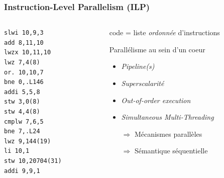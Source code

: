 \documentclass[xcolor={x11names,svgnames}]{beamer}
\begin{document}
\begin{frame}[fragile]
  \frametitle{Instruction-Level Parallelism (ILP)}

  \begin{columns}
    \begin{column}{3cm}  
\begin{verbatim}
slwi 10,9,3
add 8,11,10
lwzx 10,11,10
lwz 7,4(8)
or. 10,10,7
bne 0,.L146
addi 5,5,8
stw 3,0(8)
stw 4,4(8)
cmplw 7,6,5
bne 7,.L24
lwz 9,144(19)
li 10,1
stw 10,20704(31)
addi 9,9,1
\end{verbatim}
    \end{column}  

    \begin{column}{7cm}
      code = liste \emph{ordonnée} d'instructions

      \medskip

      \begin{alertblock}{Parallélisme au sein d'un coeur}
      \begin{itemize}
      \item \emph{Pipeline(s)}
      \item \emph{Superscalarité}
      \item \emph{Out-of-order execution}
      \item \emph{Simultaneous Multi-Threading}
      \end{itemize}
    \end{alertblock}

    \begin{itemize}
    \item[$\Rightarrow$] Mécanismes parallèles
    \item[$\Rightarrow$] Sémantique séquentielle
    \end{itemize}
    
    \end{column}
  \end{columns}
\end{frame}

\end{document}
